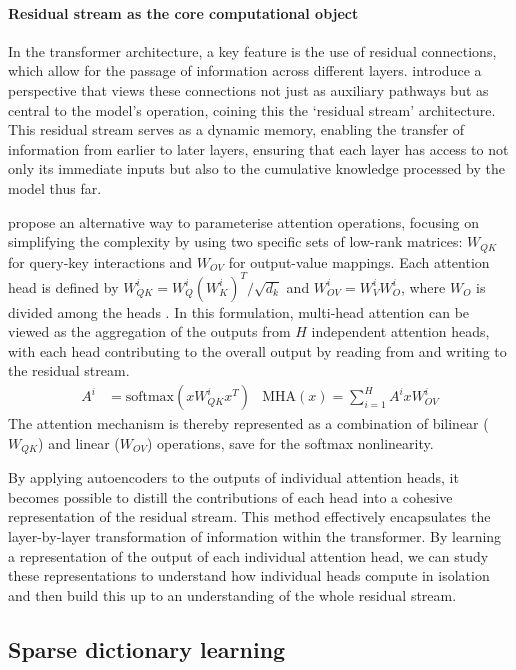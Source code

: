 \documentclass[11pt]{scrartcl}
\begin{document}
\paragraph{Residual stream as the core computational object}
In the transformer architecture, a key feature is the use of residual connections, which allow for the passage of information across different layers. \citet{elhage2021mathematical} introduce a perspective that views these connections not just as auxiliary pathways but as central to the model's operation, coining this the `residual stream' architecture. This residual stream serves as a dynamic memory, enabling the transfer of information from earlier to later layers, ensuring that each layer has access to not only its immediate inputs but also to the cumulative knowledge processed by the model thus far.

\citet{elhage2021mathematical} propose an alternative way to parameterise attention operations, focusing on simplifying the complexity by using two specific sets of low-rank matrices: \(W_{QK}\) for query-key interactions and \(W_{OV}\) for output-value mappings. Each attention head is defined by \(W_{QK}^i = W_Q^i(W_K^i)^T / \sqrt{d_k}\) and \(W_{OV}^i = W_V^iW_O^i\), where \(W_O\) is divided among the heads \citep{lindner2024tracr}. In this formulation, multi-head attention can be viewed as the aggregation of the outputs from \(H\) independent attention heads, with each head contributing to the overall output by reading from and writing to the residual stream.
\begin{align*}
A^i &= \text{softmax}(xW_{QK}^ix^T) & \text{MHA}(x) = \sum_{i=1}^H A^ixW_{OV}^i
\end{align*}
The attention mechanism is thereby represented as a combination of bilinear (\(W_{QK}\)) and linear (\(W_{OV}\)) operations, save for the softmax nonlinearity.

By applying autoencoders to the outputs of individual attention heads, it becomes possible to distill the contributions of each head into a cohesive representation of the residual stream. This method effectively encapsulates the layer-by-layer transformation of information within the transformer. By learning a representation of the output of each individual attention head, we can study these representations to understand how individual heads compute in isolation and then build this up to an understanding of the whole residual stream.

\subsection{Sparse dictionary learning}
\end{document}
